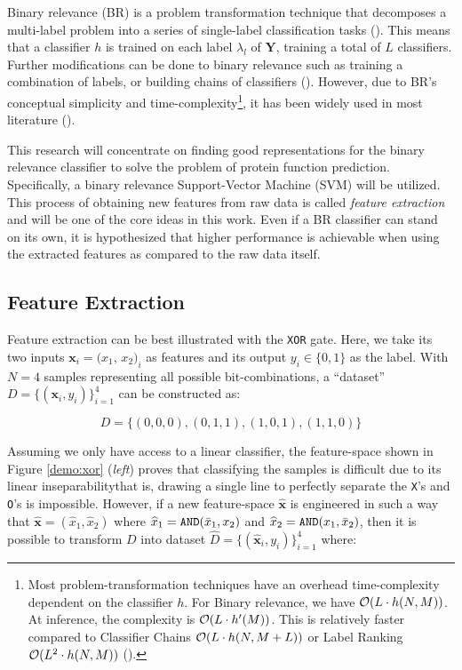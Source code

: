 \par Binary relevance (BR) is a problem transformation technique that
decomposes a multi-label problem into a series of single-label classification
tasks (\cite{boutell2004learning, tsoumakas2007multilabel}). This means that a
classifier $h$ is trained on each label $\lambda_l$ of $\mathbf{Y}$, training
a total of $L$ classifiers. Further modifications can be done to binary
relevance such as training a combination of labels, or building chains of
classifiers (\cite{read2009classifier}). However, due to BR's conceptual
simplicity and time-complexity\footnote[2]{
    Most problem-transformation techniques have an overhead time-complexity
    dependent on the classifier $h$. For Binary relevance, we have $\mathcal{O}(L
    \cdot h(N, M))$. At inference, the complexity is $\mathcal{O}(L
    \cdot h'(M))$. This is relatively faster compared to Classifier Chains
    $\mathcal{O}(L \cdot h(N, M + L))$ or Label Ranking $\mathcal{O}(L^{2} \cdot h(N, M))$
    (\cite{zhang2014review}).
}, it has been widely used
in most literature (\cite{zhang2017binary}).

\par This research will concentrate on finding good representations for the
binary relevance classifier to solve the problem of protein function
prediction. Specifically, a binary relevance Support-Vector Machine (SVM) will
be utilized. This process of obtaining new features from raw data is called 
\textit{feature extraction} and will be one of the core ideas in this work. Even
if a BR classifier can stand on its own, it is hypothesized that higher
performance is achievable when using the extracted features as compared to the
raw data itself.

\subsection{Feature Extraction}

\par Feature extraction can be best illustrated with the \texttt{XOR} gate.
Here, we take its two inputs $\mathbf{x}_{i} = (x_{1}$, $x_{2})_{i}$ as features
and its output $y_{i} \in \{0,1\}$ as the label. With $N=4$ samples
representing all possible bit-combinations, a ``dataset''
$D=\{(\mathbf{x}_{i}, y_{i})\}_{i=1}^{4}$ can be constructed as:

\[
    D = \{(0,0,0), (0,1,1), (1,0,1), (1,1,0)\}
\]

Assuming we only have access to a linear classifier, the feature-space shown
in Figure  \ref{demo:xor} (\textit{left}) proves that classifying the samples is
difficult due to its linear inseparability\textemdash that is, drawing a single
line to perfectly separate the \texttt{X}'s and \texttt{O}'s is impossible.
However, if a new feature-space $\mathbf{\widehat{x}}$ is engineered in such a
way that $\mathbf{\widehat{x}} = (\widehat{x}_{1}, \widehat{x}_2)$ where 
$\widehat{x}_{1} = \text{\texttt{AND}}(\bar{x}_{1}, x_{2})$ and $\widehat{x}_{2}
= \text{\texttt{AND}}(x_{1}, \bar{x}_{2})$, then it is possible to transform $D$
into dataset $\widehat{D}=\{(\mathbf{\widehat{x}}_{i}, y_{i})\}_{i=1}^{4}$
where:


